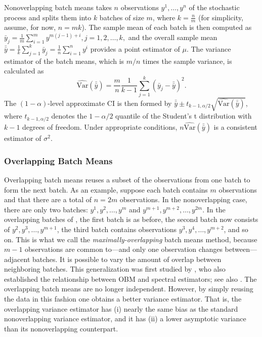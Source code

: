 \documentclass[12pt]{article}
\newcommand{\varhat}{\widehat{\mathrm{Var}}}
\newcommand{\yb}{\bar{y}}
\newcommand{\ybb}{\bar{\yb}}
\begin{document}
Nonoverlapping batch means takes $n$ observations $y^1, \dots, y^n$ of the stochastic process and splits them into $k$ batches of size $m$, where $k = \frac{n}{m}$ (for simplicity, assume, for now, $n = mk$).  
The sample mean of each batch is then computed as
$
	\yb_j = \frac{1}{m} \sum_{i=1}^{m} y^{m(j-1)+i}, j = 1,2, \dots, k,
$
and the overall sample mean $\ybb = \frac{1}{k} \sum_{j=1}^k \yb_j = \frac{1}{n} \sum_{i=1}^n y^i$ provides a point estimator of $\mu$.  
The variance estimator of the batch means, which is $m/n$ times the sample variance, is calculated as
\begin{equation} \label{eq:var}
	\varhat(\ybb) = \frac{m}{n}\frac{1}{k-1} \sum_{j=1}^k \left( \yb_j - \ybb \right)^2.
\end{equation}
The $(1-\alpha)$-level approximate CI is then formed by $\ybb \pm t_{k-1,\alpha/2} \sqrt{\varhat(\ybb)}$, where $t_{k-1,\alpha/2}$ denotes the $1-\alpha/2$ quantile of the Student's t distribution with $k-1$ degrees of freedom.  
Under appropriate conditions, $n\varhat(\ybb)$ is a consistent estimator of $\sigma^2$.

\subsubsection{Overlapping Batch Means}
\label{ssec:overlap}

Overlapping batch means reuses a subset of the observations from one batch to form the next batch. 
As an example, suppose each batch contains $m$ observations and that there are a total of $n=2m$ observations.
In the nonoverlapping case, there are only two batches:
$y^1, y^2, \dots, y^m$ and $y^{m+1}, y^{m+2}, \dots, y^{2m}$.  
In the overlapping batches of \citet{Meketon1984}, the first batch is as before, the second batch now consists of $y^2, y^3, \dots, y^{m+1}$, the third batch contains observations $y^3, y^4, \dots, y^{m+2}$, and so on.  
This is what we call the \emph{maximally-overlapping} batch means method, because $m-1$ observations are common to---and only one observation changes between---adjacent batches.  
It is possible to vary the amount of overlap between neighboring batches. 
This generalization was first studied by \citet{Welch1987}, who also established the relationship between OBM and spectral estimators; see also \citep{Song1992}.
%
The overlapping batch means 
are no longer independent. 
However, by simply reusing the data in this fashion one obtains a better variance estimator. 
That is, the overlapping variance estimator has (i) nearly the same bias as the standard nonoverlapping variance estimator, and it has (ii)
a lower asymptotic variance than its nonoverlapping counterpart. 
\end{document}
